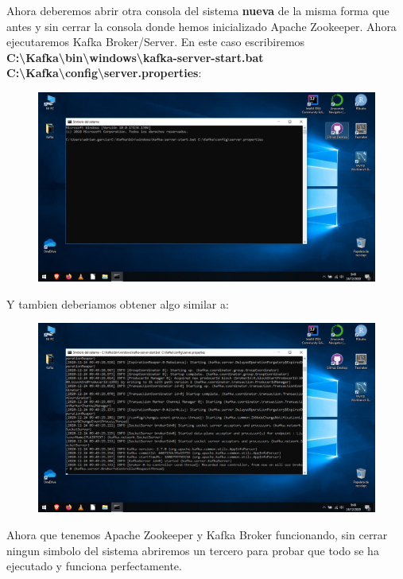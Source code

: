 \documentclass[a4paper,10pt]{article}
\begin{document}
Ahora deberemos abrir otra consola del sistema \textbf{nueva} de la misma forma que antes y sin cerrar la consola donde hemos inicializado Apache Zookeeper. Ahora ejecutaremos Kafka Broker/Server. En este caso escribiremos \textbf{C:\textbackslash Kafka\textbackslash bin\textbackslash windows\textbackslash kafka-server-start.bat C:\textbackslash Kafka\textbackslash config\textbackslash server.properties}:

\begin{figure}[H]
\begin{center}
\includegraphics[width=450pt]{./fotos/Kafka/08.jpg}
\end{center}
\end{figure}

Y tambien deberiamos obtener algo similar a:

\begin{figure}[H]
\begin{center}
\includegraphics[width=450pt]{./fotos/Kafka/09.jpg}
\end{center}
\end{figure}

Ahora que tenemos Apache Zookeeper y Kafka Broker funcionando, sin cerrar ningun simbolo del sistema abriremos un tercero para probar que todo se ha ejecutado y funciona perfectamente.
\end{document}
